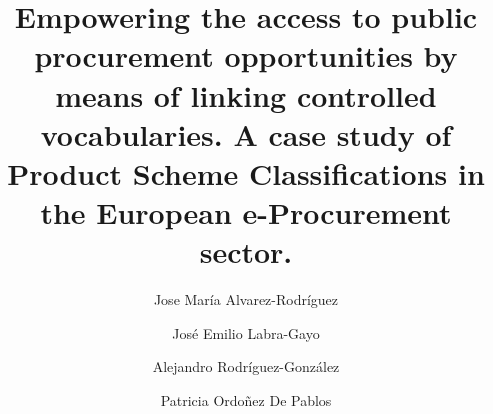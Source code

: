 \documentclass[preprint,12pt]{elsarticle}
\begin{document}
\begin{frontmatter}





\title{Empowering the access to public procurement opportunities by means of linking controlled vocabularies.  A case study of Product Scheme Classifications in the European e-Procurement sector.}


\author[label1]{Jose María Alvarez-Rodríguez}
\address[label1]{The South East European Research Center, Thessaloniki, Greece.}

\author[label2]{José Emilio Labra-Gayo}
\address[label2]{WESO Research Group, Department of Computer Science, University of Oviedo, 33007, Oviedo, Spain.}

\author[label3]{Alejandro Rodríguez-González}
\address[label3]{Bioinformatics at Centre for Plant Biotechnology and Genomics UPM-INIA, Polytechnic University of Madrid, Madrid, Spain.}

\author[label4]{Patricia Ordoñez De Pablos}
\address[label4]{WESO Research Group, Department of Business Administration, University of Oviedo, 33007, Oviedo, Spain.}





\author{}


\end{frontmatter}
\end{document}
